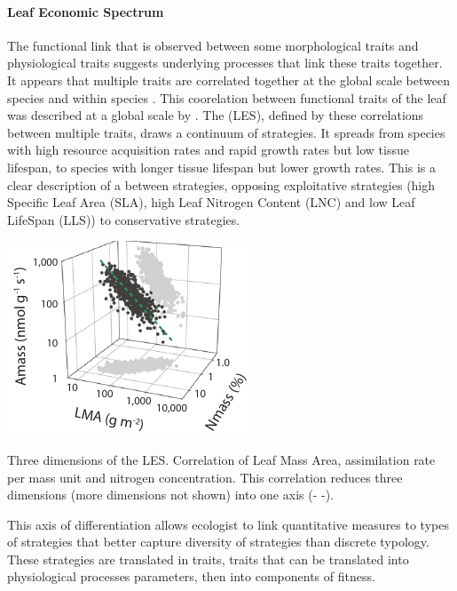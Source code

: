 \paragraph{Leaf Economic Spectrum}
The functional link that is observed between some morphological traits and physiological traits suggests underlying processes that link these traits together. It appears that multiple traits are correlated together at the global scale between species \parencite{reich_evolution_2003,	 wright_worldwide_2004, chave_towards_2009, reich_world-wide_2014} and within species \parencite{hu_novel_2015}. This coorelation between functional traits of the leaf was described at a global scale by \cite{wright_worldwide_2004}. The  (LES), defined by these correlations between multiple traits, draws a continuum of strategies. It spreads from species with high resource acquisition rates and rapid growth rates but low tissue lifespan, to species with longer tissue lifespan but lower growth rates. This is a clear description of a  between strategies, opposing exploitative strategies (high Specific Leaf Area (SLA), high Leaf Nitrogen Content (LNC) and low Leaf LifeSpan (LLS)) to conservative strategies.


\begin{marginfigure}
    \includegraphics{./Figures/LES1_m.pdf}
  \caption[Leaf Economic Spectrum]{Three dimensions of the LES. Correlation of Leaf Mass Area, assimilation rate per mass unit and nitrogen concentration. This correlation reduces three dimensions (more dimensions not shown) into one axis (\textcolor{myGreen}{- -}).}
  \label{fg:insurance}
\end{marginfigure}

This axis of differentiation allows ecologist to link quantitative measures to types of strategies that better capture diversity of strategies than discrete typology. These strategies are translated in traits, traits that can be translated into physiological processes parameters, then into components of fitness.

